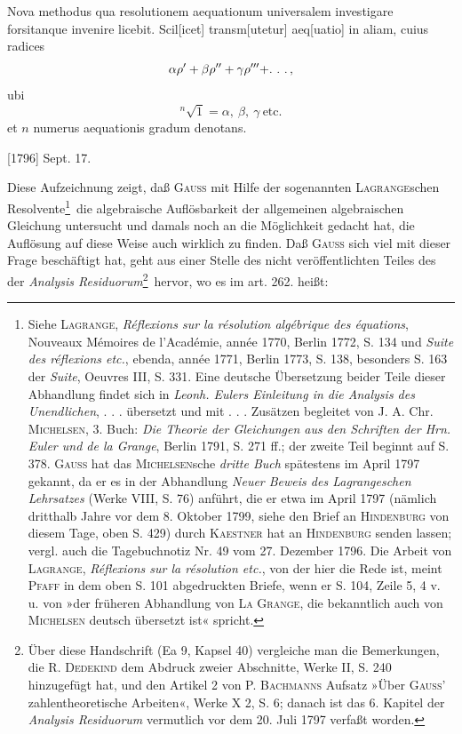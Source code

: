 \indent Nova methodus qua resolutionem aequationum universalem investigare forsitanque invenire licebit. Scil[icet] transm[utetur] aeq[uatio] in aliam, cuius
\clearpage{}
\noindent radices
\[
\alpha\rho'+\beta\rho''+\gamma\rho'''+\ldotp\,\ldotp\,\ldotp,
\]
\noindent ubi
\[
{}^{n}\!\surd1=\alpha,\ \beta,\ \gamma\ \text{etc.}
\]
\noindent et \(n\) numerus aequationis gradum denotans.
\par\noindent\hfill[1796] Sept. 17.

\medskip\begingroup\small
\indent Diese Aufzeichnung zeigt, daß \textsc{Gauss} mit Hilfe der sogenannten \textsc{Lagrange}schen Resolvente\footnote{Siehe \textsc{Lagrange}, \textit{Réflexions sur la résolution algébrique des équations}, Nouveaux Mémoires de l’Académie, année 1770, Berlin 1772, S. 134 und \textit{Suite des réflexions etc.}, ebenda, année 1771, Berlin 1773, S. 138, besonders S. 163 der \textit{Suite}, Oeuvres III, S. 331. Eine deutsche Übersetzung beider Teile dieser Abhandlung findet sich in \textit{Leonh. Eulers Einleitung in die Analysis des Unendlichen}, . . . übersetzt und mit . . . Zusätzen begleitet von J. A. Chr. \textsc{Michelsen}, 3. Buch: \textit{Die Theorie der Gleichungen aus den Schriften der Hrn. Euler und de la Grange}, Berlin 1791, S. 271 ff.; der zweite Teil beginnt auf S. 378. \textsc{Gauss} hat das \textsc{Michelsen}sche \textit{dritte Buch} spätestens im April 1797 gekannt, da er es in der Abhandlung \textit{Neuer Beweis des Lagrangeschen Lehrsatzes} (Werke VIII, S. 76) anführt, die er etwa im April 1797 (nämlich dritthalb Jahre vor dem 8. Oktober 1799, siehe den Brief an \textsc{Hindenburg} von diesem Tage, oben S. 429) durch \textsc{Kaestner} hat an \textsc{Hindenburg} senden lassen; vergl. auch die Tagebuchnotiz Nr. 49 vom 27. Dezember 1796. Die Arbeit von \textsc{Lagrange}, \textit{Réflexions sur la résolution etc.}, von der hier die Rede ist, meint \textsc{Pfaff} in dem oben S. 101 abgedruckten Briefe, wenn er S. 104, Zeile 5, 4 v. u. von »der früheren Abhandlung von \textsc{La Grange}, die bekanntlich auch von \textsc{Michelsen} deutsch übersetzt ist« spricht.}\ die algebraische Auflösbarkeit der allgemeinen algebraischen Gleichung untersucht und damals noch an die Möglichkeit gedacht hat, die Auflösung auf diese Weise auch wirklich zu finden. Daß \textsc{Gauss} sich viel mit dieser Frage beschäftigt hat, geht aus einer Stelle des nicht veröffentlichten Teiles des  der \textit{Analysis Residuorum}\begingroup\renewcommand{\thefootnote}{**)}\footnote{Über diese Handschrift (Ea 9, Kapsel 40) vergleiche man die Bemerkungen, die R. \textsc{Dedekind} dem Abdruck zweier Abschnitte, Werke II, S. 240 hinzugefügt hat, und den Artikel 2 von P. \textsc{Bachmanns} Aufsatz »Über \textsc{Gauss}' zahlentheoretische Arbeiten«, Werke X 2, S. 6; danach ist das 6. Kapitel der \textit{Analysis Residuorum} vermutlich vor dem 20. Juli 1797 verfaßt worden.}\endgroup\ hervor, wo es im art. 262. heißt:
\par\endgroup

